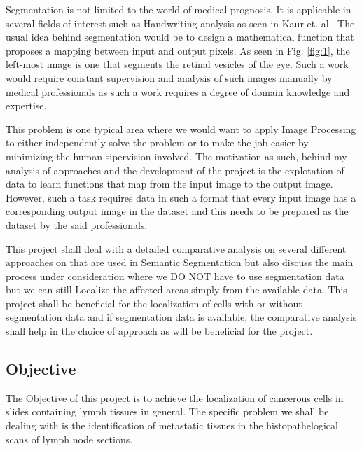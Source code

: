 \documentclass[19pt]{article}
\begin{document}
Segmentation is not limited to the world of medical prognosis. It is applicable in several fields of interest such as Handwriting analysis as seen in Kaur et. al.\cite{kour2014real}. The usual idea behind segmentation would be to design a mathematical function that proposes a mapping between input and output pixels. As seen in Fig. \ref{fig:1}, the left-most image is one that segments the retinal vesicles of the eye. Such a work would require constant supervision and analysis of such images manually by medical professionals as such a work requires a degree of domain knowledge and expertise.

This problem is one typical area where we would want to apply Image Processing to either independently solve the problem or to make the job easier by minimizing the human sipervision involved. The motivation as such, behind my analysis of approaches and the development of the project is the explotation of data to learn functions that map from the input image to the output image. However, such a task requires data in such a format that every input image has a corresponding output image in the dataset and this needs to be prepared as the dataset by the said professionals. 

This project shall deal with a detailed comparative analysis on several different approaches on that are used in Semantic Segmentation but also discuss the main process under consideration where we DO NOT have to use segmentation data but we can still Localize the affected areas simply from the available data. This project shall be beneficial for the localization of cells with or without segmentation data and if segmentation data is available, the comparative analysis shall help in the choice of approach as will be beneficial for the project. 

\subsection{Objective}
The Objective of this project is to achieve the localization of cancerous cells in slides containing lymph tissues in general. The specific problem we shall be dealing with is the identification of metastatic tissues in the histopathelogical scans of lymph node sections. 
\end{document}
